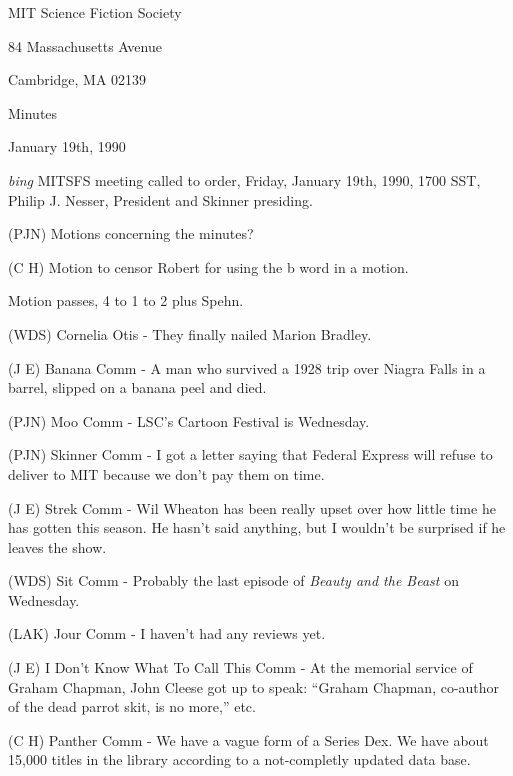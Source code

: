 \setlength{\topmargin}{-0.5in}
\setlength{\oddsidemargin}{-0.60in}
\setlength{\textheight}{9in}
\setlength{\textwidth}{6.5in}



\begin{center}
MIT Science Fiction Society

84 Massachusetts Avenue

Cambridge, MA 02139

\vspace{0.2in}
Minutes

January 19th, 1990

\end{center}
 
\vspace{0.15in}
{\em bing\/}  MITSFS meeting called to order, Friday, January 19th, 1990,
1700 SST, Philip J. Nesser, President and Skinner presiding.

(PJN) Motions concerning the minutes?

(C H) Motion to censor Robert for using the b word in a motion.

Motion passes, 4 to 1 to 2 plus Spehn.

(WDS) Cornelia Otis - They finally nailed Marion Bradley.

(J E) Banana Comm - A man who survived a 1928 trip over Niagra Falls
in a barrel, slipped on a banana peel and died.

(PJN) Moo Comm - LSC's Cartoon Festival is Wednesday.

(PJN) Skinner Comm - I got a letter saying that Federal Express will
refuse to deliver to MIT because we don't pay them on time.

(J E) Strek Comm - Wil Wheaton has been really upset over how little
time he has gotten this season.  He hasn't said anything, but I
wouldn't be surprised if he leaves the show.

(WDS) Sit Comm - Probably the last episode of {\em Beauty and the
Beast} on Wednesday.

(LAK) Jour Comm - I haven't had any reviews yet.

(J E) I Don't Know What To Call This Comm - At the memorial service of
Graham Chapman, John Cleese got up to speak: ``Graham Chapman,
co-author of the dead parrot skit, is no more,'' etc.

(C H) Panther Comm - We have a vague form of a Series Dex.  We have
about 15,000 titles in the library according to a not-completly
updated data base.

